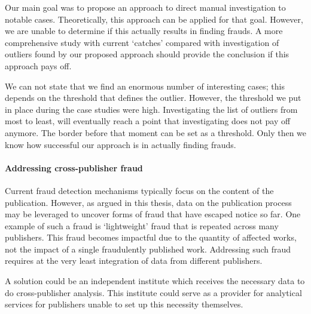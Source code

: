 \documentclass{ou-report}
\begin{document}
Our main goal was to propose an approach to direct manual investigation to 
notable cases. Theoretically, this approach can be applied for that goal. 
However, we are unable to determine if this actually results in finding frauds. 
A more comprehensive study with current ‘catches’ compared with investigation of 
outliers found by our proposed approach should provide the conclusion if this 
approach pays off.

We can not state that we find an enormous number of interesting cases; this 
depends on the threshold that defines the outlier. However, the threshold we 
put in place during the case studies were high. Investigating the list of 
outliers from most to least, will eventually reach a point that investigating 
does not pay off anymore. The border before that moment can be set as a 
threshold. Only then we know how successful our approach is in actually 
finding frauds.





\paragraph{Addressing cross-publisher fraud}
Current fraud detection mechanisms typically focus on the content of the 
publication. However, as argued in this thesis, data on the publication process 
may be leveraged to uncover forms of fraud that have escaped notice so far. One 
example of such a fraud is `lightweight' fraud that is repeated across many 
publishers. This fraud becomes impactful due to the quantity of affected works, 
not the impact of a single fraudulently published work.
Addressing such fraud requires at the very least integration of data from 
different publishers.


A solution could be an independent institute which receives the necessary data 
to do cross-publisher analysis. This institute could serve as a provider for
analytical services for publishers unable to set up this necessity themselves.
\end{document}
